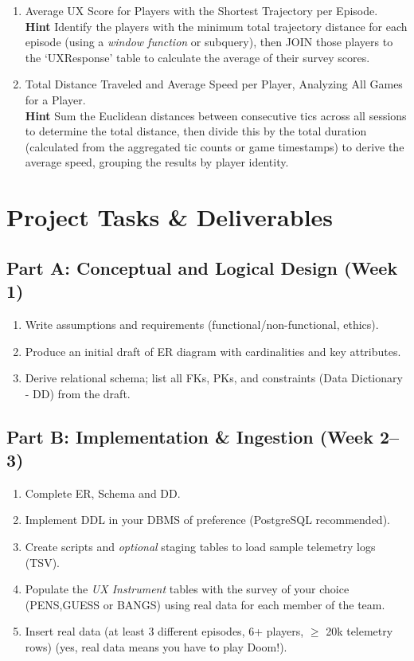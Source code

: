 \documentclass[11pt]{article}
\begin{document}
\begin{enumerate}
  \item Average UX Score for Players with the Shortest Trajectory per Episode. \\
  \textbf{Hint} Identify the players with the minimum total trajectory distance for each episode (using a \textit{window function}  or subquery), then JOIN those players to the `UXResponse' table to calculate the average of their survey scores.

  \item Total Distance Traveled and Average Speed per Player, Analyzing All Games for a Player. \\
  \textbf{Hint} Sum the Euclidean distances between consecutive tics across all sessions to determine the total distance, then divide this by the total duration (calculated from the aggregated tic counts or game timestamps) to derive the average speed, grouping the results by player identity.

\end{enumerate}

\section{Project Tasks \& Deliverables}

\subsection*{Part A: Conceptual and Logical Design (Week 1)}
\begin{enumerate}[leftmargin=*]
  \item Write assumptions and requirements (functional/non-functional, ethics).
  \item Produce an initial draft of ER diagram with cardinalities and key attributes.
  \item Derive relational schema; list all FKs, PKs, and constraints (Data Dictionary - DD) from the draft.
\end{enumerate}

\subsection*{Part B: Implementation \& Ingestion (Week 2--3)}
\begin{enumerate}[leftmargin=*]
  \item Complete ER, Schema and DD.
  \item Implement DDL in your DBMS of preference (PostgreSQL recommended).
  \item Create scripts and \textit{optional} staging tables to load sample telemetry logs (TSV).
  \item Populate the \textit{UX Instrument} tables with the survey of your choice (PENS,GUESS or BANGS) using real data for each member of the team.
  \item Insert real data (at least 3 different episodes, 6+ players, $\geq$ 20k telemetry rows) (yes, real data means you have to play Doom!).
\end{enumerate}
\end{document}
